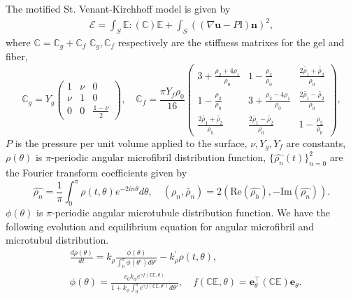 \documentclass[11pt]{amsart}
\numberwithin{figure}{section}
\theoremstyle{plain}
\theoremstyle{definition}
\numberwithin{equation}{section}
\begin{document}
The motified St. Venant-Kirchhoff model is given by
\begin{align}\label{VK_model}
  \mathcal{E} = \int_S \mathbb{E} : \left(\mathbb{C} \right)\mathbb{E} +  \int_{S} \left( (\nabla \bm{u} - P \mathbb{I})\bm{n}\right)^{2} , 
\end{align}
where $\mathbb{C} = \mathbb{C}_{g} + \mathbb{C}_{f}$
$\mathbb{C}_{g} , \mathbb{C}_{f} $ respectively are the stiffness matrixes for the gel and fiber,
\[
\mathbb{C}_{g} = Y_{g} \left(
\begin{array}{ccc}
  1 & \nu & 0 \\
  \nu & 1 & 0 \\
  0 & 0 & \frac{ 1-\nu }{ 2 } 
\end{array}
\right), \quad
\mathbb{C}_{f}  = \frac{ \pi Y_{f} \rho_0 }{ 16 } \left(
\begin{array}{ccc}
  3 + \frac{ \rho_2 + 4 \rho_1 }{\rho_0 } & 1- \frac{ \rho_2 }{  \rho_0 } & \frac{ 2\widetilde{\rho_1} + \widetilde{\rho_2}}{\rho_0  }  \\
  1- \frac{ \rho_2 }{  \rho_0 } &  3 + \frac{ \rho_2 - 4 \rho_1 }{\rho_0 } & \frac{ 2\widetilde{\rho_1} - \widetilde{\rho_2}}{\rho_0  }  \\
  \frac{ 2\widetilde{\rho_1} + \widetilde{\rho_2}}{\rho_0  }  & \frac{ 2\widetilde{\rho_1} - \widetilde{\rho_2}}{\rho_0  } &   1- \frac{ \rho_2 }{  \rho_0 } 
\end{array}
\right),
\] 
$P$ is the pressure per unit volume applied to the surface, $\nu,Y_{g} , Y_{f} $ are constants,
$\rho(\theta)$ is $\pi$-periodic angular microfibril distribution function, $\{\widehat{\rho_{n}}(t)\}_{n=0}^{2}  $ are the Fourier transform coefficients given by
\[
\widehat{\rho_{n}}  = \frac{1}{ \pi } \int_{0} ^{\pi} \rho(t, \theta) e^{-2in\theta} d\theta, \quad 
\left(\rho_{n} , \widetilde{\rho_{n} }\right) = 2 \left( \text{Re} \left(\widehat{\rho_{h} }\right), - \text{Im} \left( \widehat{\rho_{n} }\right)\right).
\] 
$\phi(\theta) $ is $\pi$-periodic angular microtubule distribution function.
We have the following evolution and equilibrium equation for angular microfibril and microtubul distribution.
\begin{align}
&  \frac{d \rho (\theta)}{d t}   = k_\rho \frac{\phi(\theta)}{\int_0^\pi \phi(\theta') d \theta'}  - k_\rho^{'}\rho(t, \theta),\\
&  \phi(\theta)   = \frac{c_0 k_\phi e^{\gamma f(\mathbb{C} \mathbb{E}, \theta)}}{1 + k_\phi \int_0^\pi e^{ \gamma f(\mathbb{C}\mathbb{E},\theta')} d \theta'}, 
\quad  f(\mathbb{C}  \mathbb{E}, \theta)  = \bm{e}_\theta^{\top}   \left (\mathbb{C}  \mathbb{E} \right)  \bm{e}_\theta.
\end{align}
\end{document}
